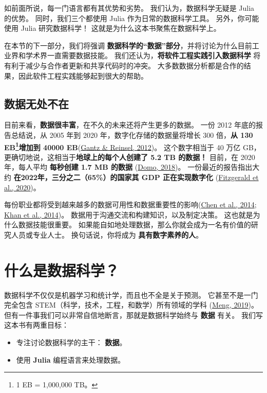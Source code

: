 \documentclass[
  notoc %
]{tufte-book}
\providecommand{\tightlist}{%
  \setlength{\itemsep}{0pt}\setlength{\parskip}{0pt}
}
\begin{document}
如前面所说，每一门语言都有其优势和劣势。 我们认为，数据科学无疑是 Julia
的优势。 同时，我们三个都使用 Julia 作为日常的数据科学工具。
另外，你可能使用 Julia 研究数据科学！
这就是为什么这本书聚焦在数据科学上。

在本节的下一部分，我们将强调
\textbf{数据科学的``数据''部分}，并将讨论为什么目前工业界和学术界一直需要数据技能。
我们还认为，\textbf{将软件工程实践引入数据科学}
将有利于减少与合作者更新和共享代码时的冲突。
大多数数据分析都是合作的结果，因此软件工程实践能够起到很大的帮助。

\hypertarget{sec:data_everywhere}{%
\subsection{数据无处不在}\label{sec:data_everywhere}}

目前来看，\textbf{数据很丰富}，在不久的未来还将产生更多的数据。 一份
2012 年底的报告总结说，从 2005 年到 2020 年，数字化存储的数据量将增长
300 倍，\textbf{从 130 EB\footnote{1 EB = 1,000,000 TB。}增加到 40000
EB}(\protect\hyperlink{ref-gantz2012digital}{Gantz \& Reinsel, 2012})。
这个数字相当于 40 万亿
GB，更确切地说，这相当于\textbf{地球上的每个人创建了 5.2 TB 的数据！}
目前，在 2020 年，每人平均 \textbf{每秒创建 1.7 MB 的数据}
(\protect\hyperlink{ref-domo2018data}{Domo, 2018})。
一份最近的报告指出大约 \textbf{在2022年，三分之二（65\%）的国家其 GDP
正在实现数字化} (\protect\hyperlink{ref-fitzgerald2020idc}{Fitzgerald et
al., 2020})。

每份职业都将受到越来越多的数据可用性和数据重要性的影响(\protect\hyperlink{ref-chen2014big}{Chen
et al., 2014}; \protect\hyperlink{ref-khan2014big}{Khan et al., 2014})。
数据用于沟通交流和构建知识，以及制定决策。
这也就是为什么数据技能很重要。
如果能自如地处理数据，那么你就会成为一名有价值的研究人员或专业人士。
换句话说，你将成为 \textbf{具有数字素养的人}。

\hypertarget{sec:why_data_science}{%
\section{什么是数据科学？}\label{sec:why_data_science}}

数据科学不仅仅是机器学习和统计学，而且也不全是关于预测。
它甚至不是一门完全包含 STEM（科学，技术，工程，和数学）所有领域的学科
(\protect\hyperlink{ref-Meng2019Data}{Meng, 2019})。
但有一件事我们可以非常自信地断言，那就是数据科学始终与 \textbf{数据}
有关。 我们写这本书有两重目标：

\begin{itemize}
\tightlist
\item
  专注讨论数据科学的主干： \textbf{数据}。
\item
  使用 \textbf{Julia} 编程语言来处理数据。
\end{itemize}
\end{document}
